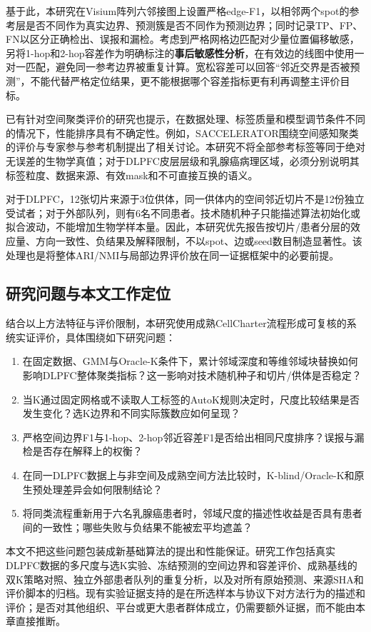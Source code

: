 基于此，本研究在Visium阵列六邻接图上设置严格edge-F1，以相邻两个spot的参考层是否不同作为真实边界、预测簇是否不同作为预测边界；同时记录TP、FP、FN以区分正确检出、误报和漏检。考虑到严格网格边匹配对少量位置偏移敏感，另将1-hop和2-hop容差作为明确标注的\textbf{事后敏感性分析}，在有效边的线图中使用一对一匹配，避免同一参考边界被重复计算。宽松容差可以回答“邻近交界是否被预测”，不能代替严格定位结果，更不能根据哪个容差指标更有利再调整主评价目标。

已有针对空间聚类评价的研究也提示，在数据处理、标签质量和模型调节条件不同的情况下，性能排序具有不确定性。例如，SACCELERATOR围绕空间感知聚类的评价与专家参与参考机制提出了相关讨论\cite{sun2026}。本研究不将全部参考标签等同于绝对无误差的生物学真值；对于DLPFC皮层层级和乳腺癌病理区域，必须分别说明其标签粒度、数据来源、有效mask和不可直接互换的语义。

对于DLPFC，12张切片来源于3位供体，同一供体内的空间邻近切片不是12份独立受试者；对于外部队列，则有6名不同患者。技术随机种子只能描述算法初始化或拟合波动，不能增加生物学样本量。因此，本研究优先报告按切片/患者分层的效应量、方向一致性、负结果及解释限制，不以spot、边或seed数目制造显著性。该处理也是将整体ARI/NMI与局部边界评价放在同一证据框架中的必要前提。

\subsection{研究问题与本文工作定位}
\label{subsec:cc-questions-background-v1}

结合以上方法特征与评价限制，本研究使用成熟CellCharter流程形成可复核的系统实证评价，具体围绕如下研究问题：
\begin{enumerate}
  \item 在固定数据、GMM与Oracle-K条件下，累计邻域深度和等维邻域块替换如何影响DLPFC整体聚类指标？这一影响对技术随机种子和切片/供体是否稳定？
  \item 当K通过固定网格或不读取人工标签的AutoK规则决定时，尺度比较结果是否发生变化？选K边界和不同实际簇数应如何呈现？
  \item 严格空间边界F1与1-hop、2-hop邻近容差F1是否给出相同尺度排序？误报与漏检是否存在解释上的权衡？
  \item 在同一DLPFC数据上与非空间及成熟空间方法比较时，K-blind/Oracle-K和原生预处理差异会如何限制结论？
  \item 将同类流程重新用于六名乳腺癌患者时，邻域尺度的描述性收益是否具有患者间的一致性；哪些失败与负结果不能被宏平均遮盖？
\end{enumerate}

本文不把这些问题包装成新基础算法的提出和性能保证。研究工作包括真实DLPFC数据的多尺度与选K实验、冻结预测的空间边界和容差评价、成熟基线的双K策略对照、独立外部患者队列的重复分析，以及对所有原始预测、来源SHA和评价脚本的归档。现有实验证据支持的是在所选样本与协议下对方法行为的描述和评价；是否对其他组织、平台或更大患者群体成立，仍需要额外证据，而不能由本章直接推断。
